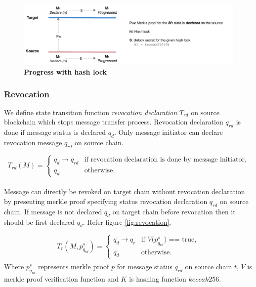 \documentclass[12pt,a4paper]{article}
\begin{document}
\begin{figure}[htb]
    \centering
	\includegraphics[width=\textwidth]{progress_with_hashlock}
	\caption{\textbf{Progress with hash lock}}
	\label{fig:progress_with_hashlock}
\end{figure}
\subsubsection{Revocation}\label{gateway:revocation}

We define state transition function \emph{revocation declaration} $T_{rd}$ on source blockchain which stops message transfer process. Revocation declaration $q_{rd}$ is done if message status is declared ${q_d}$.  
Only message initiator can declare revocation message $q_{rd}$  on source chain.

\begin{equation*}
T_{rd}(M)=\begin{cases}
q_d \rightarrow q_{rd} & \text{if revocation declaration is done by message initiator},\\
q_d& \text{otherwise}.
\end{cases}
\end{equation*}
\begin{align*}
\end{align*}

Message can directly be revoked on target chain without revocation declaration by presenting merkle proof specifying status revocation declaration $q_{rd}$ on source chain. If message is not declared ${q_d}$ on target chain before revocation then it should be first declared ${q_d}$.
 Refer figure \ref{fig:revocation}.

\begin{equation*}
T_{r}(M,p^s_{q_{rd}})=\begin{cases}
q_d \rightarrow q_{r} & \text{if $V$($p^s_{q_{rd}}$) == true},\\
q_d& \text{otherwise}.
\end{cases}
\end{equation*}
\begin{align*}
\end{align*}
Where $p^s_{q_{rd}}$ represents merkle proof $p$ for message status $q_{rd}$ on source chain $t$, $V$ is merkle proof verification function and $K$ is hashing function $keccak256$.
\end{document}
